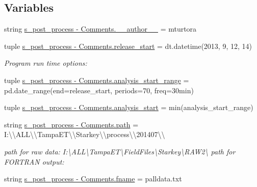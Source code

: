 \subsection*{Variables}
\begin{DoxyCompactItemize}
\item 
string \hyperlink{namespaces__post__process_01-_01_comments_aa93abb3c2ba5b38151b6fae9743987e1}{s\+\_\+post\+\_\+process -\/ Comments.\+\_\+\+\_\+author\+\_\+\+\_\+} = \textquotesingle{}mturtora\textquotesingle{}
\item 
tuple \hyperlink{namespaces__post__process_01-_01_comments_a76368c115dbbbd72360ddbd4ec4a9a04}{s\+\_\+post\+\_\+process -\/ Comments.\+release\+\_\+start} = dt.\+datetime(2013, 9, 12, 14)
\begin{DoxyCompactList}\small\item\em Program run time options\+: \end{DoxyCompactList}\item 
tuple \hyperlink{namespaces__post__process_01-_01_comments_a52f70ed51d091a8626e86e98b3375f39}{s\+\_\+post\+\_\+process -\/ Comments.\+analysis\+\_\+start\+\_\+range} = pd.\+date\+\_\+range(end=release\+\_\+start, periods=70, freq=\textquotesingle{}30min\textquotesingle{})
\item 
tuple \hyperlink{namespaces__post__process_01-_01_comments_a9323e6fee869aa9c51bc49305dcb973d}{s\+\_\+post\+\_\+process -\/ Comments.\+analysis\+\_\+start} = min(analysis\+\_\+start\+\_\+range)
\item 
string \hyperlink{namespaces__post__process_01-_01_comments_a443ac998e99f88439a5522c68a86609f}{s\+\_\+post\+\_\+process -\/ Comments.\+path} = \textquotesingle{}I\+:\textbackslash{}\textbackslash{}\+A\+L\+L\textbackslash{}\textbackslash{}\+Tampa\+E\+T\textbackslash{}\textbackslash{}\+Starkey\textbackslash{}\textbackslash{}process\textbackslash{}\textbackslash{}201407\textbackslash{}\textbackslash{}\textquotesingle{}
\begin{DoxyCompactList}\small\item\em path for raw data\+: \textquotesingle{}I\+:\textbackslash{}A\+L\+L\textbackslash{}Tampa\+E\+T\textbackslash{}Field\+Files\textbackslash{}Starkey\textbackslash{}R\+A\+W2\textbackslash{}\textquotesingle{} path for F\+O\+R\+T\+R\+A\+N output\+: \end{DoxyCompactList}\item 
string \hyperlink{namespaces__post__process_01-_01_comments_a755936030fef486b5e163765fe6030b8}{s\+\_\+post\+\_\+process -\/ Comments.\+fname} = \textquotesingle{}palldata.\+txt\textquotesingle{}

\end{DoxyCompactItemize}
